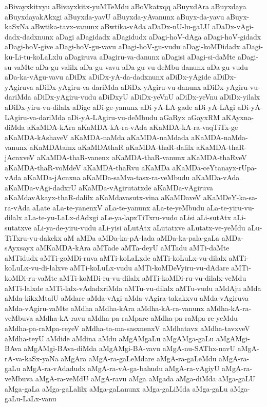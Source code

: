 {aBivayxkitxyu
aBivayxkitx-yuMTeMdu
aBoVkatxqq
aBuyxdAra
aBuyxdaya
aBuyxdayakAkxgi
aBuyxda-yavU
aBuyxda-yAvanunx
aBuyx-da-yavu
aBuyx-kaSxNa
aBwtika-tavx-vanunx
aBwtika-vAda
aDaDx-nU-lu-gaLU
aDaDx-vAgi-dadx-dadxnunx
aDagi
aDagidadx
aDagidudx
aDagi-hoV-dAga
aDagi-hoV-gidadx
aDagi-hoV-give
aDagi-hoV-gu-vavu
aDagi-hoV-gu-vudu
aDagi-koMDidadx
aDagi-ku-Li-tu-koLaLxlu
aDagiruva
aDagiru-va-danunx
aDagisi
aDagi-si-daMte
aDagi-su-vaMte
aDa-gu-valilx
aDa-gu-vavu
aDa-gu-vu-deMbu-danunx
aDa-gu-vudu
aDa-ka-vAgu-vavu
aDiDx
aDiDx-yA-da-dadxnunx
aDiDx-yAgide
aDiDx-yAgiruva
aDiDx-yAgiru-va-dariMda
aDiDx-yAgiru-vu-danunx
aDiDx-yAgiru-vu-dariMda
aDiDx-yAgiru-vudu
aDiDxyU
aDiDx-yeVnU
aDiDx-yeVnu
aDiDx-yilalx
aDiDx-yiru-vu-dilalx
aDige
aDi-ge-yanunx
aDi-yA-LA-gade
aDi-yA-LAgi
aDi-yA-LAgiru-va-dariMda
aDi-yA-LAgiru-vu-deMbudu
aGaRyx
aGayxRM
aKAyxna-diMda
aKaMDA-kAra
aKaMDA-kA-ra-vAda
aKaMDA-kA-ra-vaqTiTx-ge
aKaMDA-kAshaveV
aKaMDA-naMda
aKaMDA-naMdada
aKaMDA-naMda-vanunx
aKaMDAtamx
aKaMDAthaR
aKaMDA-thaR-dalilx
aKaMDA-thaR-jAcnxveV
aKaMDA-thaR-vanenx
aKaMDA-thaR-vanunx
aKaMDA-thaRveV
aKaMDA-thaR-voMdeV
aKaMDA-thaRvu
aKaMDa
aKaMDa-ceYtanayx-rUpa-vAda
aKaMDa-jAcnxna
aKaMDa-saMva-tasx-ra-veMbudu
aKaMDa-vAda
aKaMDa-vAgi-dadxrU
aKaMDa-vAgirutatxde
aKaMDa-vAgiruva
aKaMdavAkayx-thaR-dalilx
aKaMdavasutx-vina
aKaMDaveV
aKaMDeY-ka-sa-ra-vAda
aLate
aLa-te-yanenxV
aLa-te-yanunx
aLa-te-yeMbudu
aLa-te-yiru-vu-dilalx
aLa-te-yu-LaLx-dAdxgi
aLe-ya-lapxTiTxru-vudo
aLisi
aLi-sutAtx
aLi-sutatxve
aLi-ya-de-yiru-vudu
aLi-yisi
aLutAtx
aLutatxve
aLutatx-ve-yeMdu
aLu-TiTxru-vu-dakekx
aM
aMDa
aMDa-ka-pA-lada
aMDa-ka-pala-gaLa
aMDa-sAyxsayx
aMKaMDA-kAra
aMTade
aMTa-deyU
aMTadu
aMTi-daMte
aMTidudx
aMTi-goMDi-ruva
aMTi-koLaLxde
aMTi-koLuLx-vu-dilalx
aMTi-koLuLx-vu-di-lalxve
aMTi-koLuLx-vudu
aMTi-koMDeVyiru-vu-dAdare
aMTi-koMDi-ru-vaMte
aMTi-koMDi-ru-vu-dilalx
aMTi-koMDi-ru-vu-dilalx-veMdu
aMTi-lalxde
aMTi-lalx-vAdadxriMda
aMTu-vu-dilalx
aMTu-vudu
aMdAju
aMda
aMda-kikxMtalU
aMdare
aMda-vAgi
aMda-vAgira-takakxvu
aMda-vAgiruva
aMda-vAgiru-vaMte
aMdha
aMdha-kAra
aMdha-kA-ra-vanunx
aMdha-kA-ra-veMbuva
aMdha-kA-ravu
aMdha-pa-raMpare
aMdha-pa-raMpa-re-yeMdu
aMdha-pa-raMpa-reyeV
aMdha-ta-ma-sasxnenxV
aMdhatavx
aMdha-tavxveV
aMdha-teyU
aMdide
aMdina
aMdu
aMgAMgaLu
aMgAMga-gaLu
aMgAMgi-BAva
aMgAMgi-BAva-diMda
aMgAMgi-BA-vavu
aMgA-nu-SAThx-navU
aMgA-rA-va-kaSx-yaNa
aMgAra
aMgA-ra-gaLeMdare
aMgA-ra-gaLeMdu
aMgA-ra-gaLu
aMgA-ra-vAdadudx
aMgA-ra-vA-ga-bahudu
aMgA-ra-vAgiyU
aMgA-ra-veMbuva
aMgA-ra-veMdU
aMgA-ravu
aMga
aMgada
aMga-diMda
aMga-gaLU
aMga-gaLa
aMga-gaLalilx
aMga-gaLanunx
aMga-gaLiMda
aMga-gaLu
aMga-gaLu-LaLx-vanu
}
